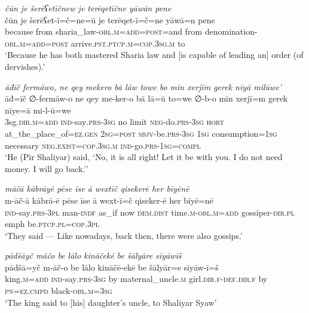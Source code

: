 \ea \label{ŽP.88}
\textit{čūn je šerēʕetīčnew je terēqetīčne yāwān pene} \\ 
\gll čūn je šerēʕet-ī=č=ne=ū je terēqet-ī=č=ne yāwā=n pene \\ 
 because from sharia\_law\textsc{-obl}\textsc{.m}\textsc{=add}\textsc{=\textsc{post}}=and from denomination\textsc{-obl}\textsc{.m}\textsc{=add}\textsc{=\textsc{post}} arrive\textsc{.pst}\textsc{.ptcp}\textsc{.m}\textsc{=cop}\textsc{.3sg}\textsc{.m} to \\ 
\glt `Because he has both mastered Sharia law and [is capable of leading an] order (of dervishes).'
\z 
 
\ea \label{ŽP.105}
\textit{āđīč fermāwo, ne qey mekero bā lāw towe bo min xerjīm gerek nīyā milūwe’} \\ 
\gll āđ=īč ∅-fermāw-o ne qey me-ker-o bā lā=ū to=we ∅-b-o min xerjī=m gerek nīye=ā mi-l-ū=we \\ 
 3sg\textsc{.dir}\textsc{.m}\textsc{=add} \textsc{ind-}say\textsc{.prs}\textsc{-3sg} no limit \textsc{neg-}do\textsc{.prs}\textsc{-3sg} \textsc{hort} at\_the\_place\_of\textsc{\textsc{=ez.gen}} \textsc{2sg}\textsc{=\textsc{post}} \textsc{sbjv-}be\textsc{.prs}\textsc{-3sg} \textsc{1sg} consumption\textsc{=\textsc{1sg}} necessary \textsc{\textsc{neg.}exist}\textsc{=cop}\textsc{.3sg}\textsc{.m} \textsc{ind-}go\textsc{.prs}\textsc{-\textsc{1sg}}\textsc{=compl} \\ 
\glt `He (Pir Shaliyar) said, ‘No, it is all right! Let it be with you. I do not need money. I will go back.’'
\z 
 
\ea \label{ŽP.125}
\textit{māčā kābrāyē pēse īse ā wextīč qisekerē her bīyēnē} \\ 
\gll m-āč-ā kābrā-ē pēse īse ā wext-ī=č qiseker-ē her bīyē=nē \\ 
 \textsc{ind-}say\textsc{.prs}\textsc{-3pl} man\textsc{-indf} as\_if now \textsc{dem.dist} time\textsc{.m}\textsc{-obl}\textsc{.m}\textsc{=add} gossiper\textsc{-dir}\textsc{.pl} emph be\textsc{.ptcp}\textsc{.pl}\textsc{=cop}\textsc{.3pl} \\ 
\glt `They said — Like nowadays, back then, there were also gossips.'
\z 
 
\ea \label{ŽP.157}
\textit{pādšāyč māčo be lālo kināčekē be šālyāre sīyāwīš} \\ 
\gll pādšā=yč m-āč-o be lālo kināčē-ekē be šālyār=e sīyāw-ī=š \\ 
 king\textsc{.m}\textsc{=add} \textsc{ind-}say\textsc{.prs}\textsc{-3sg} by maternal\_uncle\textsc{.m} girl\textsc{.dir}\textsc{.f}\textsc{-def}\textsc{.dir}\textsc{.f} by \textsc{pn}\textsc{=ez}\textsc{.cmpd} black\textsc{-obl}\textsc{.m}\textsc{=3sg} \\ 
\glt `The king said to [his] daughter’s uncle, to Shaliyar Syaw'
\z 
 

